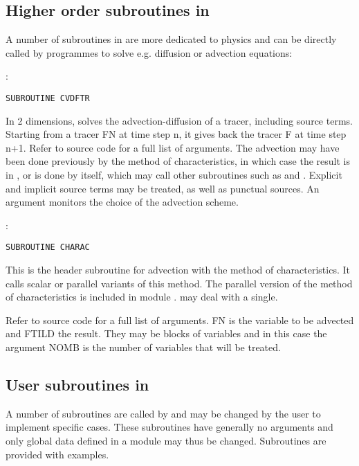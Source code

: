 \subsection{Higher order subroutines in \bief}

A number of subroutines in \bief are more dedicated to physics and can be
directly called by programmes to solve e.g. diffusion or advection equations:

:
\begin{lstlisting}[language=TelFortran]
SUBROUTINE CVDFTR
\end{lstlisting}

In 2 dimensions, solves the advection-diffusion of a tracer, including source
terms. Starting from a tracer FN at time step n, it gives back the tracer F at
time step n+1. Refer to source code for a full list of arguments. The advection
may have been done previously by the method of characteristics, in which case
the result is in , or is done by  itself, which
may call other subroutines such as  and .
Explicit and implicit source terms may be treated, as well as punctual sources.
An argument  monitors the choice of the advection scheme.

:
\begin{lstlisting}[language=TelFortran]
SUBROUTINE CHARAC
\end{lstlisting}

This is the header subroutine for advection with the method of characteristics.
It calls scalar or parallel variants of this method. The parallel version of
the method of characteristics is included in module .
 may deal with a single.

Refer to source code for a full list of arguments. FN is the variable to be
advected and FTILD the result. They may be blocks of variables and in this case
the argument NOMB is the number of variables that will be treated.

\subsection{User subroutines in \bief}

A number of subroutines are called by \bief and may be changed by the user to
implement specific cases. These subroutines have generally no arguments and
only global data defined in a module may thus be changed. Subroutines are
provided with examples.

